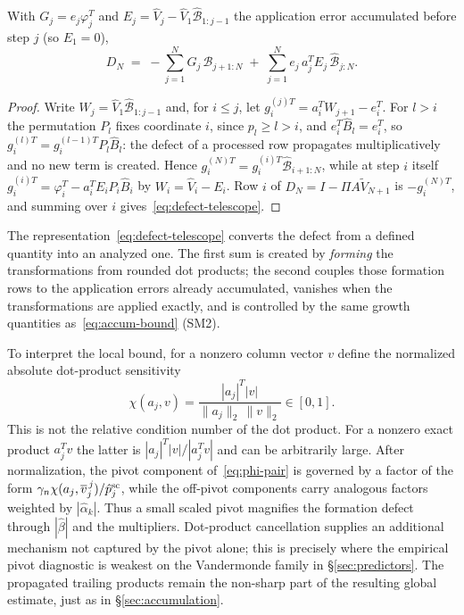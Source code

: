 \documentclass[review,onefignum,onetabnum]{siamart251216}
\begin{document}
\begin{theorem}\label{thm:defect-structure}
With $G_j = e_j\varphi_j^T$ and
$E_j = \widehat V_j - \widehat V_1\widehat{\mathcal B}_{1:j-1}$ the application error
accumulated before step $j$ (so $E_1 = 0$),
%
\begin{equation}\label{eq:defect-telescope}
D_N
\;=\;
-\sum_{j=1}^{N} G_j\,\widehat{\mathcal{B}}_{j+1:N}
\;+\;
\sum_{j=1}^{N} e_j\,a_j^T E_j\,\widehat{\mathcal{B}}_{j:N} .
\end{equation}
\end{theorem}

\begin{proof}
Write $W_j = \widehat V_1\widehat{\mathcal B}_{1:j-1}$ and, for $i\le j$, let
$g_i^{(j)T} = a_i^TW_{j+1} - e_i^T$. For $l>i$ the permutation $P_l$ fixes coordinate $i$, since
$p_l\ge l>i$, and $e_i^T\widehat B_l = e_i^T$, so $g_i^{(l)T} = g_i^{(l-1)T}P_l\widehat B_l$: the
defect of a processed row propagates multiplicatively and no new term is created. Hence
$g_i^{(N)T} = g_i^{(i)T}\widehat{\mathcal B}_{i+1:N}$, while at step $i$ itself
$g_i^{(i)T} = \varphi_i^T - a_i^TE_iP_i\widehat B_i$ by $W_i=\widehat V_i-E_i$. Row $i$ of
$D_N=I-\Pi A\widetilde V_{N+1}$ is $-g_i^{(N)T}$, and summing over $i$
gives~\eqref{eq:defect-telescope}.
\end{proof}

The representation~\eqref{eq:defect-telescope} converts the defect from a defined quantity
into an analyzed one. The first sum is created by \emph{forming} the transformations from rounded
dot products; the second couples those formation rows to the application errors already
accumulated, vanishes when the transformations are applied exactly, and is controlled by the same
growth quantities as~\eqref{eq:accum-bound} (SM2).

To interpret the local bound, for a nonzero column vector $v$ define the normalized absolute
dot-product sensitivity
%
\begin{equation}\label{eq:chi}
\chi(a_j,v)
=
\frac{|a_j|^T|v|}{\|a_j\|_2\,\|v\|_2}
\in[0,1].
\end{equation}
%
This is not the relative condition number of the dot product. For a nonzero exact product
$a_j^Tv$ the latter is $|a_j|^T|v|/|a_j^Tv|$ and can be arbitrarily large. After normalization,
the pivot component of~\eqref{eq:phi-pair} is governed by a factor of the form
$\gamma_n\chi(a_j,\overline v_j^{\,j})/\hat p_j^{\rm sc}$, while the off-pivot components carry
analogous factors weighted by $|\hat\alpha_k|$. Thus a small scaled pivot magnifies the formation
defect through $|\hat\beta|$ and the multipliers. Dot-product cancellation supplies an additional mechanism not
captured by the pivot alone; this is precisely where the empirical pivot diagnostic is weakest on
the Vandermonde family in \S\ref{sec:predictors}. The propagated trailing products remain the
non-sharp part of the resulting global estimate, just as in \S\ref{sec:accumulation}.
\end{document}
